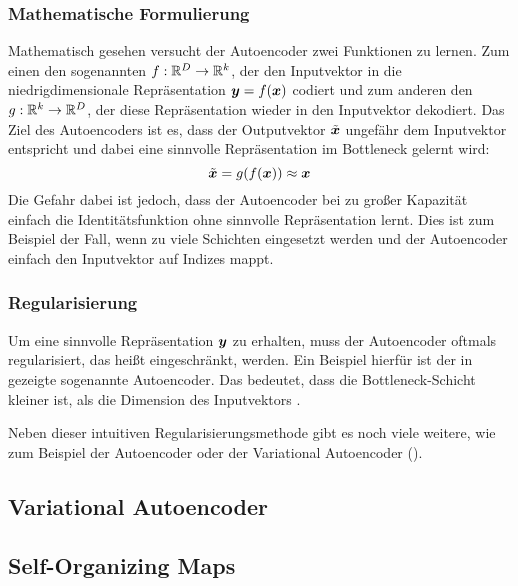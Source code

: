 \subsubsection{Mathematische Formulierung}
\label{ch:MethodenDerDimRed:modern:AE:MathematischeFormulierung}
Mathematisch gesehen versucht der Autoencoder zwei Funktionen zu lernen. Zum einen den sogenannten  $f: \mathbb{R}^D \rightarrow \mathbb{R}^k$, der den Inputvektor in die niedrigdimensionale Repräsentation $\bm{y} = f(\bm{x})$ codiert und zum anderen den  $g: \mathbb{R}^k \rightarrow \mathbb{R}^D$, der diese Repräsentation wieder in den Inputvektor dekodiert. Das Ziel des Autoencoders ist es, dass der Outputvektor $\tilde{\bm{x}}$ ungefähr dem Inputvektor entspricht und dabei eine sinnvolle Repräsentation im Bottleneck gelernt wird:
\begin{equation}
	\tilde{\bm{x}} = g(f(\bm{x})) \approx \bm{x}
\end{equation}
Die Gefahr dabei ist jedoch, dass der Autoencoder bei zu großer Kapazität einfach die Identitätsfunktion ohne sinnvolle Repräsentation lernt. Dies ist zum Beispiel der Fall, wenn zu viele Schichten eingesetzt werden und der Autoencoder einfach den Inputvektor auf Indizes mappt.

\subsubsection{Regularisierung}

Um eine sinnvolle Repräsentation $\bm{y}$ zu erhalten, muss der Autoencoder oftmals
regularisiert, das heißt eingeschränkt, werden. Ein Beispiel hierfür ist der in
 gezeigte sogenannte  Autoencoder. Das
bedeutet, dass die Bottleneck-Schicht kleiner ist, als die Dimension des Inputvektors \parencite[503]{Goodfellow.2016}.

Neben dieser intuitiven Regularisierungsmethode gibt es noch viele weitere, wie zum Beispiel der
 Autoencoder oder der Variational Autoencoder
().

\subsection{Variational Autoencoder}
\label{ch:MethodenDerDimRed:modern:VAE}

\subsection{Self-Organizing Maps}
\label{ch:MethodenDerDimRed:modern:SOM}
